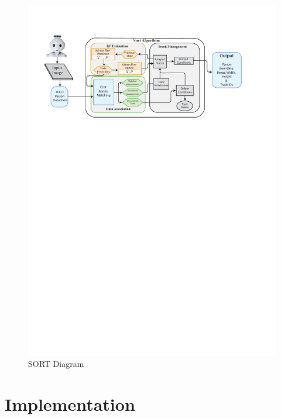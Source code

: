 \documentclass{CSSRforAfrica}
\begin{document}
\begin{figure}[!hbpt]
	\centering
	\includegraphics[scale=0.8]{images/SORT_Diagram.pdf}
	\caption{SORT Diagram}
	\label{fig: SORT Diagram}
\end{figure}

\newpage

\section{Implementation}
\end{document}
